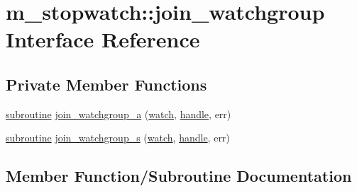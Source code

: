 \hypertarget{interfacem__stopwatch_1_1join__watchgroup}{}\section{m\+\_\+stopwatch\+:\+:join\+\_\+watchgroup Interface Reference}
\label{interfacem__stopwatch_1_1join__watchgroup}
\subsection*{Private Member Functions}
\begin{DoxyCompactItemize}
\item 
\hyperlink{M__stopwatch_83_8txt_acfbcff50169d691ff02d4a123ed70482}{subroutine} \hyperlink{interfacem__stopwatch_1_1join__watchgroup_a73bc10b1e935d997bdef8ef2c2d1c3cc}{join\+\_\+watchgroup\+\_\+a} (\hyperlink{read__watch_83_8txt_ad2129669fa47b8899641309620add095}{watch}, \hyperlink{leave__watchgroup_83_8txt_ad6c5ebd26f707ef8da754021612a7c8d}{handle}, err)
\item 
\hyperlink{M__stopwatch_83_8txt_acfbcff50169d691ff02d4a123ed70482}{subroutine} \hyperlink{interfacem__stopwatch_1_1join__watchgroup_a704b0809dc7432556badc54c5005cbdb}{join\+\_\+watchgroup\+\_\+s} (\hyperlink{read__watch_83_8txt_ad2129669fa47b8899641309620add095}{watch}, \hyperlink{leave__watchgroup_83_8txt_ad6c5ebd26f707ef8da754021612a7c8d}{handle}, err)
\end{DoxyCompactItemize}


\subsection{Member Function/\+Subroutine Documentation}
\mbox{\label{interfacem__stopwatch_1_1join__watchgroup_a73bc10b1e935d997bdef8ef2c2d1c3cc}} 
